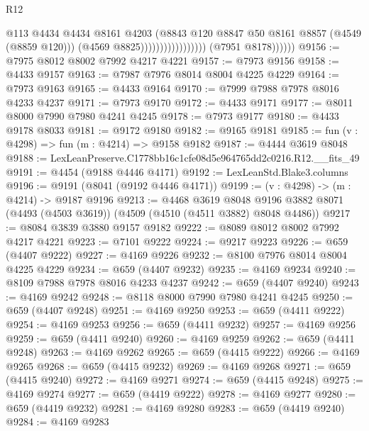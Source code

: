\begin{lexlean}{R12}
\begin{coremodule}
                                              @113
                                              @4434
                                              @4434
                                              @8161
                                              @4203
                                              (@8843
                                                @120
                                                @8847
                                                @50
                                                @8161
                                                @8857
                                                (@4549 (@8859 @120)))
                                              (@4569 @8825)))))))))))))))))
              (@7951 @8178))))))
@9156 := @7975 @8012 @8002 @7992 @4217 @4221
@9157 := @7973 @9156
@9158 := @4433 @9157
@9163 := @7987 @7976 @8014 @8004 @4225 @4229
@9164 := @7973 @9163
@9165 := @4433 @9164
@9170 := @7999 @7988 @7978 @8016 @4233 @4237
@9171 := @7973 @9170
@9172 := @4433 @9171
@9177 := @8011 @8000 @7990 @7980 @4241 @4245
@9178 := @7973 @9177
@9180 := @4433 @9178 @8033
@9181 := @9172 @9180
@9182 := @9165 @9181
@9185 := fun (v : @4298) => fun (m : @4214) => @9158 @9182
@9187 := @4444 @3619 @8048
@9188 := LexLeanPreserve.C1778bb16c1cfe08d5e964765dd2c0216.R12.__fits_49
@9191 := @4454 (@9188 @4446 @4171)
@9192 := LexLeanStd.Blake3.columns
@9196 := @9191 (@8041 (@9192 @4446 @4171))
@9199 := (v : @4298) -> (m : @4214) -> @9187 @9196
@9213 := @4468
    @3619
    @8048
    @9196
    @3882
    @8071
    (@4493 (@4503 @3619))
    (@4509 (@4510 (@4511 @3882) @8048 @4486))
@9217 := @8084 @3839 @3880 @9157 @9182
@9222 := @8089 @8012 @8002 @7992 @4217 @4221
@9223 := @7101 @9222
@9224 := @9217 @9223
@9226 := @659 (@4407 @9222)
@9227 := @4169 @9226
@9232 := @8100 @7976 @8014 @8004 @4225 @4229
@9234 := @659 (@4407 @9232)
@9235 := @4169 @9234
@9240 := @8109 @7988 @7978 @8016 @4233 @4237
@9242 := @659 (@4407 @9240)
@9243 := @4169 @9242
@9248 := @8118 @8000 @7990 @7980 @4241 @4245
@9250 := @659 (@4407 @9248)
@9251 := @4169 @9250
@9253 := @659 (@4411 @9222)
@9254 := @4169 @9253
@9256 := @659 (@4411 @9232)
@9257 := @4169 @9256
@9259 := @659 (@4411 @9240)
@9260 := @4169 @9259
@9262 := @659 (@4411 @9248)
@9263 := @4169 @9262
@9265 := @659 (@4415 @9222)
@9266 := @4169 @9265
@9268 := @659 (@4415 @9232)
@9269 := @4169 @9268
@9271 := @659 (@4415 @9240)
@9272 := @4169 @9271
@9274 := @659 (@4415 @9248)
@9275 := @4169 @9274
@9277 := @659 (@4419 @9222)
@9278 := @4169 @9277
@9280 := @659 (@4419 @9232)
@9281 := @4169 @9280
@9283 := @659 (@4419 @9240)
@9284 := @4169 @9283

\end{coremodule}
\end{lexlean}
